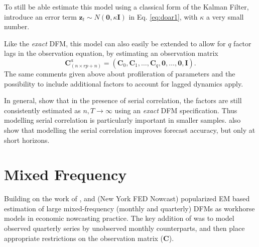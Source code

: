 \documentclass[a4paper]{article}
\begin{document}
To still be able estimate this model using a classical form of the Kalman Filter, \citet{banbura2014maximum} introduce an error term $\textbf{z}_t \sim N(\textbf{0}, \kappa \textbf{I})$ in Eq. \ref{eq:doar1}, with $\kappa$ a very small number. \newline

Like the \emph{exact} DFM, this model can also easily be extended to allow for $q$ factor lags in the observation equation, by estimating an observation matrix
\begin{equation}
\textbf{C}^a_{(n \times rp+n)}  = (\textbf{C}_0, \textbf{C}_1, \dots, \textbf{C}_q, \textbf{0}, \dots, \textbf{0}, \textbf{I}).
\end{equation}
The same comments given above about profileration of parameters and the possibility to include additional factors to account for lagged dynamics apply. \newline 

In general, \citet{doz2011two, doz2012quasi} show that in the presence of serial correlation, the factors are still consistently estimated as $n, T \to \infty$ using an \emph{exact} DFM specification. Thus modelling serial correlation is particularly important in smaller samples. \citet{banbura2014maximum} also show that modelling the serial correlation improves forecast accuracy, but only at short horizons.

\newpage 

\section{Mixed Frequency}

Building on the work of \citet{mariano2003new}, \citet{banbura2014maximum} and \citet{bok2018macroeconomic} (New York FED Nowcast) popularized EM based estimation of large mixed-frequency (monthly and quarterly) DFMs as workhorse models in economic nowcasting practice. The key addition of \citet{mariano2003new} was to model observed quarterly series by unobserved monthly counterparts, and then place appropriate restrictions on the observation matrix (\textbf{C}). \newline 
\end{document}
